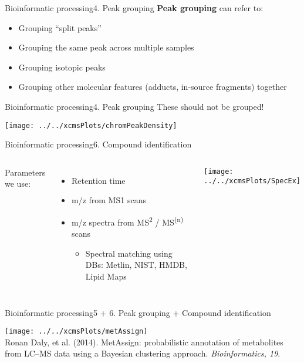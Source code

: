 \documentclass[xcolor=dvipsnames]{beamer}
\begin{document}
\begin{frame}{Bioinformatic processing}{4. Peak grouping}
\vspace{-7pt}
\textbf{Peak grouping} can refer to:
\begin{itemize}
	\item Grouping ``split peaks''
	\item Grouping the same peak across multiple samples
	\item Grouping isotopic peaks 
	\item Grouping other molecular features (adducts, in-source fragments) together
\end{itemize}
\end{frame}

\begin{frame}{Bioinformatic processing}{4. Peak grouping}
These should not be grouped!
	\begin{center}
		\texttt{[image: ../../xcmsPlots/chromPeakDensity]}
	\end{center}
\end{frame}

\begin{frame}{Bioinformatic processing}{6. Compound identification}
\vspace{-10pt}
\begin{columns}
	Parameters we use:
		\begin{itemize}
			\item Retention time \pause
			\item m/z from MS1 scans \pause
			\item m/z spectra from MS\textsuperscript{2} / MS\textsuperscript{(n)} scans \pause
			\begin{itemize}
				\item Spectral matching using DBs: Metlin, NIST, HMDB, Lipid Maps
			\end{itemize}
		\end{itemize}
	\begin{center}
			\texttt{[image: ../../xcmsPlots/SpecEx]}
	\end{center}
\end{columns}
\end{frame}

\begin{frame}{Bioinformatic processing}{5 + 6. Peak grouping + Compound identification}
\vspace{-10pt}
\begin{center}
	\texttt{[image: ../../xcmsPlots/metAssign]}
	\\
	\tiny{Ronan Daly, et al. (2014). MetAssign: probabilistic annotation of metabolites from LC–MS data using a Bayesian clustering approach. \emph{Bioinformatics, 19}.}
\end{center}
\end{frame}
\end{document}
